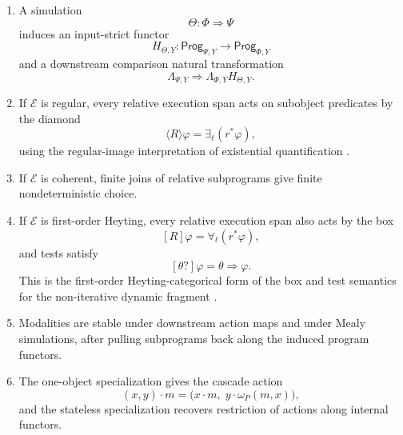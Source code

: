 \begin{theorem}
\begin{enumerate}
\item A simulation
\[
\Theta:\Phi\Rightarrow\Psi
\]
induces an input-strict functor
\[
H_{\Theta,Y}:
\mathsf{Prog}_{\Psi,Y}\to\mathsf{Prog}_{\Phi,Y}
\]
and a downstream comparison natural transformation
\[
\Lambda_{\Psi,Y}
\Rightarrow
\Lambda_{\Phi,Y}H_{\Theta,Y}.
\]

\item If \(\mathcal E\) is regular, every relative execution span acts on
subobject predicates by the diamond
\[
\langle R\rangle\varphi=\exists_\ell(r^\ast\varphi),
\]
using the regular-image interpretation of existential quantification
\cite{Jacobs1999CategoricalLogic,FongSpivakRegularRelational}.

\item If \(\mathcal E\) is coherent, finite joins of relative subprograms give
finite nondeterministic choice.

\item If \(\mathcal E\) is first-order Heyting, every relative execution span
also acts by the box
\[
[R]\varphi=\forall_\ell(r^\ast\varphi),
\]
and tests satisfy
\[
[\theta?]\varphi=\theta\Rightarrow\varphi.
\]
This is the first-order Heyting-categorical form of the box and test semantics
for the non-iterative dynamic fragment
\cite{Jacobs1999CategoricalLogic,HarelKozenTiurynDynamicLogic}.

\item Modalities are stable under downstream action maps and under Mealy
simulations, after pulling subprograms back along the induced program
functors.

\item The one-object specialization gives the cascade action
\[
(x,y)\cdot m
=
\bigl(x\cdot m,\;y\cdot\omega_P(m,x)\bigr),
\]
and the stateless specialization recovers restriction of actions along
internal functors.
\end{enumerate}
\end{theorem}

